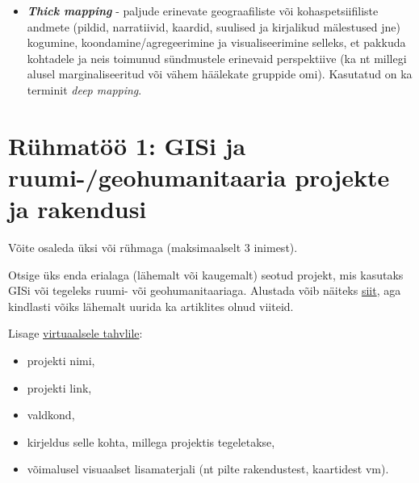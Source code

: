 \documentclass[
]{book}
\providecommand{\tightlist}{%
  \setlength{\itemsep}{0pt}\setlength{\parskip}{0pt}}
\begin{document}
\begin{itemize}
\item
  \textbf{\emph{Thick mapping}} - paljude erinevate geograafiliste või kohaspetsiifiliste andmete (pildid, narratiivid, kaardid, suulised ja kirjalikud mälestused jne) kogumine, koondamine/agregeerimine ja visualiseerimine selleks, et pakkuda kohtadele ja neis toimunud sündmustele erinevaid perspektiive (ka nt millegi alusel marginaliseeritud või vähem häälekate gruppide omi). Kasutatud on ka terminit \emph{deep mapping}.
\end{itemize}

\hypertarget{ruxfchmatuxf6uxf6-1-gisi-ja-ruumi-geohumanitaaria-projekte-ja-rakendusi}{%
\section{Rühmatöö 1: GISi ja ruumi-/geohumanitaaria projekte ja rakendusi}\label{ruxfchmatuxf6uxf6-1-gisi-ja-ruumi-geohumanitaaria-projekte-ja-rakendusi}}

Võite osaleda üksi või rühmaga (maksimaalselt 3 inimest).

Otsige üks enda erialaga (lähemalt või kaugemalt) seotud projekt, mis kasutaks GISi või tegeleks ruumi- või geohumanitaariaga. Alustada võib näiteks \href{https://anterotesis.com/wordpress/mapping-resources/dh-gis-projects/}{siit}, aga kindlasti võiks lähemalt uurida ka artiklites olnud viiteid.

Lisage \href{https://padlet.com/maarjaliisapilvik/14fuhzi8dpw9i2to}{virtuaalsele tahvlile}:

\begin{itemize}
\tightlist
\item
  projekti nimi,
\item
  projekti link,
\item
  valdkond,\\
\item
  kirjeldus selle kohta, millega projektis tegeletakse,\\
\item
  võimalusel visuaalset lisamaterjali (nt pilte rakendustest, kaartidest vm).
\end{itemize}
\end{document}

